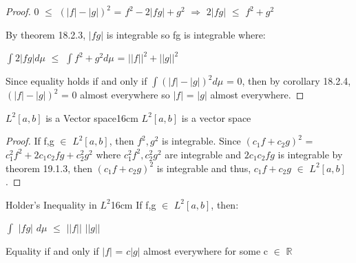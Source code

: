     \begin{proof}
        0 $\leq$ $(|f| - |g|)^2$
        = $f^2 - 2|fg| + g^2$
        \hspace{0.5cm}
        $\Rightarrow$
        \hspace{0.5cm}
        $2|fg|$ $\leq$ $f^2 + g^2$

        By {\color{red} theorem 18.2.3}, $|fg|$ is integrable so fg is integrable
        where:
        
        \hspace{0.5cm}
        $\int 2|fg| d\mu$
        $\leq$ $\int f^2 + g^2 d\mu$
        = $||f||^2 + ||g||^2$

        Since equality holds if and only if $\int (|f| - |g|)^2 d\mu$ = 0,
        then by {\color{orange} corollary 18.2.4}, $(|f| - |g|)^2$ = 0
        almost everywhere so $|f|$ = $|g|$ almost everywhere.
    \end{proof}

    \vspace{0.5cm}



    \begin{wtheorem}{$L^2[a,b]$ is a Vector space}{16cm}
        $L^2[a,b]$ is a vector space
    \end{wtheorem}

    \begin{proof}
        If f,g $\in$ $L^2[a,b]$, then $f^2,g^2$ is integrable.
        Since $(c_1f+c_2g)^2$ = $c_1^2f^2 + 2c_1c_2fg + c_2^2g^2$
        where $c_1^2f^2,c_2^2g^2$ are integrable and $2c_1c_2fg$
        is integrable by {\color{red} theorem 19.1.3}, then
        $(c_1f+c_2g)^2$ is integrable and thus,
        $c_1f+c_2g$ $\in$ $L^2[a,b]$.
    \end{proof}

    \vspace{0.5cm}



    \begin{wtheorem}{Holder's Inequality in $L^2$}{16cm}
        If f,g $\in$ $L^2[a,b]$, then:

        \hspace{0.5cm}
        $\int$ $|fg|$ $d\mu$ $\leq$ $||f||$ $||g||$

        Equality if and only if
        $|f|$ = $c|g|$ almost everywhere for some c $\in$ $\mathbb{R}$
    \end{wtheorem}

